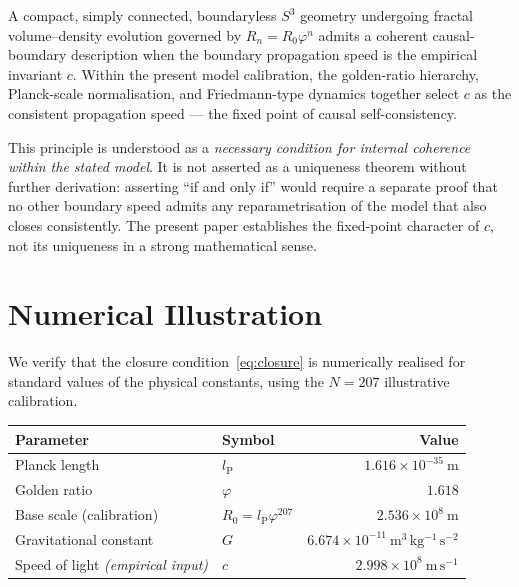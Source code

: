 \documentclass[11pt,a4paper]{article}
\newcommand{\lP}{l_{\mathrm{P}}}
\newcommand{\Rzero}{R_0}
\newcommand{\ph}{\varphi}
\begin{document}
\begin{principlebox}
A compact, simply connected, boundaryless $S^3$ geometry undergoing fractal
volume--density evolution governed by $R_n = R_0\ph^n$ admits a coherent
causal-boundary description when the boundary propagation speed is the empirical
invariant $c$. Within the present model calibration, the golden-ratio hierarchy,
Planck-scale normalisation, and Friedmann-type dynamics together select $c$ as the
consistent propagation speed — the fixed point of causal self-consistency.
\end{principlebox}

\medskip
This principle is understood as a \emph{necessary condition for internal coherence
within the stated model}. It is not asserted as a uniqueness theorem without further
derivation: asserting ``if and only if'' would require a separate proof that no
other boundary speed admits any reparametrisation of the model that also closes
consistently. The present paper establishes the fixed-point character of $c$, not
its uniqueness in a strong mathematical sense.

\section{Numerical Illustration}

We verify that the closure condition~\eqref{eq:closure} is numerically realised for
standard values of the physical constants, using the $N=207$ illustrative calibration.

\begin{center}
\renewcommand{\arraystretch}{1.35}
\begin{tabular}{llr}
  \toprule
  \textbf{Parameter} & \textbf{Symbol} & \textbf{Value} \\
  \midrule
  Planck length & $\lP$ & $1.616\times10^{-35}\ \mathrm{m}$ \\
  Golden ratio & $\ph$ & $1.618$ \\
  Base scale (calibration) & $\Rzero = \lP\ph^{207}$ & $2.536\times10^{8}\ \mathrm{m}$ \\
  Gravitational constant & $G$ & $6.674\times10^{-11}\ \mathrm{m^3\,kg^{-1}\,s^{-2}}$ \\
  Speed of light \emph{(empirical input)} & $c$ & $2.998\times10^{8}\ \mathrm{m\,s^{-1}}$ \\
  \bottomrule
\end{tabular}
\end{center}
\end{document}
